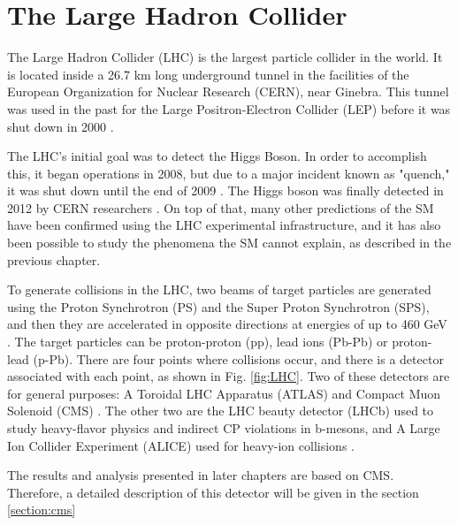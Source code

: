\chapter{\leavevmode\newline The Large Hadron Collider}
\label{chap:chapter_2}

The Large Hadron Collider (LHC) is the largest particle collider in the world. It is located inside a 26.7 km long underground tunnel in the facilities of the European Organization for Nuclear Research (CERN), near Ginebra. This tunnel was used in the past for the Large Positron-Electron Collider (LEP) before it was shut down in 2000 \cite{stiller2016full, baron2018desarrollo}.

The LHC's initial goal was to detect the Higgs Boson. In order to accomplish this, it began operations in 2008, but due to a major incident known as "quench," it was shut down until the end of 2009 \cite{di2020measurement, oneill_2015}. The Higgs boson was finally detected in 2012 by CERN researchers \cite{cern_document_server_2012}. On top of that, many other predictions of the SM have been confirmed using the LHC experimental infrastructure, and it has also been possible to study the phenomena the SM cannot explain, as described in the previous chapter.

To generate collisions in the LHC, two beams of target particles are generated using the Proton Synchrotron (PS) and the Super Proton Synchrotron (SPS), and then they are accelerated in opposite directions at energies of up to 460 GeV \cite{grummer2021search, bragagnolo2021measurement, mejia2012medida}. The target particles can be proton-proton (pp), lead ions (Pb-Pb) or proton-lead (p-Pb). There are four points where collisions occur, and there is a detector associated with each point, as shown in Fig. \ref{fig:LHC}. Two of these detectors are for general purposes: A Toroidal LHC Apparatus (ATLAS) and Compact Muon Solenoid (CMS) \cite{baron2018desarrollo, bonanomi2021response}. The other two are the LHC beauty detector (LHCb) used to study heavy-flavor physics and indirect CP violations in b-mesons, and A Large Ion Collider Experiment (ALICE) used for heavy-ion collisions \cite{stiller2016full, bonanomi2021response}.

The results and analysis presented in later chapters are based on CMS. Therefore, a detailed description of this detector will be given in the section \ref{section:cms}

